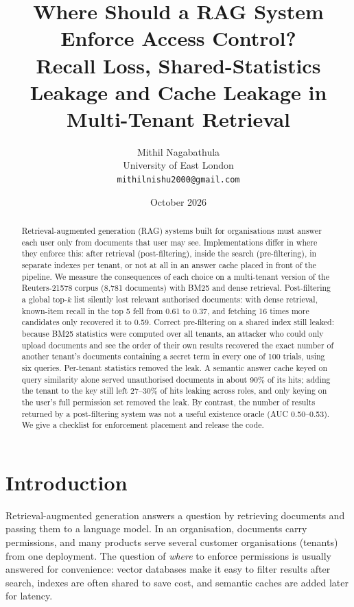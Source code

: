 \documentclass[11pt]{article}
\title{Where Should a RAG System Enforce Access Control?\\
\large Recall Loss, Shared-Statistics Leakage and Cache Leakage in Multi-Tenant Retrieval}
\author{Mithil Nagabathula\\University of East London\\\texttt{mithilnishu2000@gmail.com}}
\date{October 2026}
\begin{document}
\maketitle

\begin{abstract}
Retrieval-augmented generation (RAG) systems built for organisations must answer each user only from documents that user may see.
Implementations differ in where they enforce this: after retrieval (post-filtering), inside the search (pre-filtering), in separate
indexes per tenant, or not at all in an answer cache placed in front of the pipeline. We measure the consequences of each choice on a
multi-tenant version of the Reuters-21578 corpus (8{,}781 documents) with BM25 and dense retrieval.
Post-filtering a global top-\(k\) list silently lost relevant authorised documents: with dense retrieval, known-item recall in the
top 5 fell from 0.61 to 0.37, and fetching 16 times more candidates only recovered it to 0.59. Correct pre-filtering on a shared
index still leaked: because BM25 statistics were computed over all tenants, an attacker who could only upload documents and see the
order of their own results recovered the exact number of another tenant's documents containing a secret term in every one of 100
trials, using six queries. Per-tenant statistics removed the leak. A semantic answer cache keyed on query similarity alone served
unauthorised documents in about 90\% of its hits; adding the tenant to the key still left 27--30\% of hits leaking across roles, and
only keying on the user's full permission set removed the leak. By contrast, the number of results returned by a post-filtering system was not a useful existence oracle (AUC
0.50--0.53). We give a checklist for enforcement placement and release the code.
\end{abstract}

\section{Introduction}
Retrieval-augmented generation \cite{lewis2020rag} answers a question by retrieving documents and passing them to a language model.
In an organisation, documents carry permissions, and many products serve several customer organisations (tenants) from one
deployment. The question of \emph{where} to enforce permissions is usually answered for convenience: vector databases make it easy
to filter results after search, indexes are often shared to save cost, and semantic caches are added later for latency.
\end{document}
